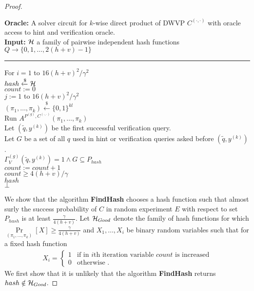 \begin{proof}
\begin{codeblock}
  \textbf{Oracle:} A solver circuit for $k$-wise direct product of DWVP $C^{(\cdot, \cdot)}$ with oracle access to hint and verification oracle.\\
  \textbf{Input:} $\mathcal{H}$ a family of pairwise independent hash functions $Q \rightarrow \{0,1,\dots, 2(h+v)-1\}$
  \medskip\hrule\medskip
  For $i = 1$ to $16(h+v)^2/\gamma^2$ \\
  \IndI $hash \xleftarrow{\$} \mathcal{H}$ \\
  \IndI $count := 0$ \\
  \IndI \For $j := 1$ to $16(h+v)^2/\gamma^2$ \\
  \IndII $(\pi_1, \dots, \pi_k) \xleftarrow{\$} \{0,1\}^{kl} $\\
  \IndII Run $A^{P^{(g)},C^{(\cdot,\cdot)}}(\pi_1, \dots, \pi_k)$\\
  \IndIII Let $(\widetilde{q},y^{(k)})$ be the first successful verification query. \\
  \IndIII Let $G$ be a set of all $q$ used in hint or verification queries asked before $(\widetilde{q},y^{(k)})$.\\
  \IndII \If $\Gamma_V^{(g)}(\widetilde{q},y^{(k)}) = 1 \land G \subseteq P_{hash}$\\
  \IndIII $count := count + 1$\\
  \IndI \If $count \geq 4(h+v)/\gamma$ \\
  \IndII \return $hash$\\
  \return $\bot$
\end{codeblock}
We show that the algorithm \textbf{FindHash} chooses a hash function such
that almost surly the success probability of $C$ in random experiment $E$
with respect to set $P_{hash}$ is at least $\frac{\gamma}{4(h+v)}$.
Let $\mathcal{H}_{Good}$ denote the family of hash functions for which $\underset{(\pi_1, \dots, \pi_k)}{\Pr}[X] \geq \frac{\gamma}{4(h+v)}$
and $X_1, \dots, X_i$ be binary random variables such that for a fixed hash function
\begin{align*}
  X_i =
  \begin{cases}
    1 & \text{if in $i$th iteration variable $count$ is increased}\\
    0 & \text{otherwise .}
  \end{cases}
\end{align*}
We first show that it is unlikely that the algorithm \textbf{FindHash} returns $hash \notin \mathcal{H}_{Good}$.

\end{proof}
